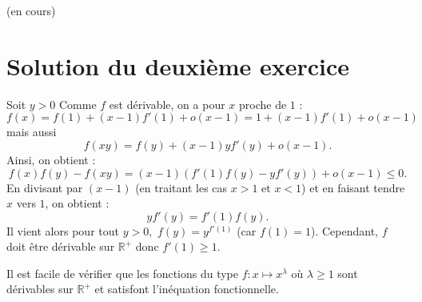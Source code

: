 (en cours)

\section{Solution du deuxième exercice} %

Soit $y>0$
Comme $f$ est dérivable, on a pour $x$ proche de $1$ : 
$$f(x)=f(1)+(x-1)f'(1)+o(x-1)=1+(x-1)f'(1)+o(x-1)$$ mais aussi $$ f(xy)=f(y)+(x-1)yf'(y)+o(x-1).$$
Ainsi, on obtient : $$f(x)f(y)-f(xy)=(x-1)\left( f'(1)f(y)-yf'(y) \right)+o(x-1)\leq 0.$$
En divisant par $(x-1)$ (en traitant les cas $x>1$ et $x<1$) et en faisant tendre $x$ vers $1$, on obtient : $$yf'(y)=f'(1)f(y).$$
Il vient alors pour tout $y>0,$ $\displaystyle f(y)=y^{f'(1)}$ (car $f(1)=1$).
Cependant, $f$ doit être dérivable sur $\mathbb{R}^{+}$ donc $f'(1)\geq 1.$

Il est facile de vérifier que les fonctions du type $ f: x\mapsto x^{\lambda}$ où $\lambda\geq 1$ sont dérivables sur $\mathbb{R}^{+}$ et satisfont l'inéquation fonctionnelle.